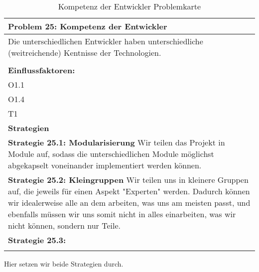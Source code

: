 \documentclass[fontsize=12pt,paper=a4,twoside]{scrartcl}
\begin{document}
\begin{table}[H]
    \centering
    \begin{tabular}{|p{15cm}|}
    \hline
          \textbf{Problem 25: Kompetenz der Entwickler}  \\ \hline
	Die unterschiedlichen Entwickler haben unterschiedliche (weitreichende) Kentnisse der Technologien. \\
         \\ \hline
          \textbf{Einflussfaktoren: } \\
	O1.1 \\
	O1.4 \\
	T1 \\
          \hline
          \textbf{Strategien} \\ \hline
            {}          
           \label{strategie:25.1}     
          \textbf{Strategie 25.1: Modularisierung} Wir teilen das Projekt in Module auf, sodass die unterschiedlichen Module möglichst abgekapselt voneinander implementiert werden können. \\        
  {}          
           \label{strategie:25.2}              
          \textbf{Strategie 25.2: Kleingruppen} Wir teilen uns in kleinere Gruppen auf, die jeweils für einen Aspekt "Experten" werden. Dadurch können wir idealerweise alle an dem arbeiten, was uns am meisten passt, und ebenfalls müssen wir uns somit nicht in alles einarbeiten, was wir nicht können, sondern nur Teile. \\
	 {}          
           \label{strategie:25.3}     
          \textbf{Strategie 25.3: }  \\ 
	 \\ \hline
    \end{tabular}

    \caption{Kompetenz der Entwickler Problemkarte}
    \label{tab:ProblemKarte25}
\end{table}
Hier setzen wir beide Strategien durch. \\
\end{document}
